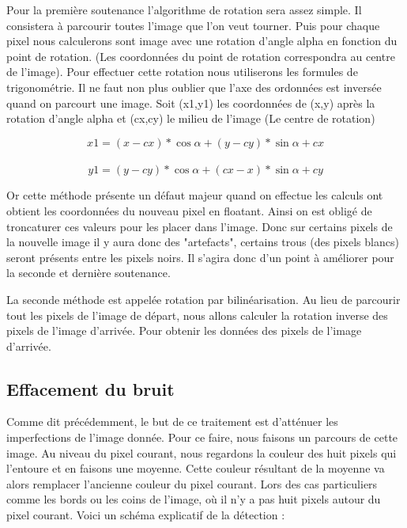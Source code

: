 \documentclass [french,12pt]{article}
\begin{document}
Pour la première soutenance l'algorithme de rotation sera assez simple. Il consistera à parcourir toutes l'image que l'on veut tourner. Puis pour chaque pixel nous calculerons sont image avec une rotation d'angle alpha en fonction du point de rotation. (Les coordonnées du point de rotation correspondra au centre de l'image).
Pour effectuer cette rotation nous utiliserons les formules de trigonométrie. Il ne faut non plus oublier que l'axe des ordonnées est inversée quand on parcourt une image. 
Soit (x1,y1) les coordonnées de (x,y) après la rotation d'angle alpha et (cx,cy) le milieu de l'image (Le centre de rotation)

\[x1 = (x-cx) * \cos \alpha + (y-cy) * \sin \alpha + cx \]
\\
\[y1 = (y-cy) * \cos \alpha + (cx-x) * \sin \alpha + cy \]

Or cette méthode présente un défaut majeur quand on effectue les calculs ont obtient les coordonnées du nouveau pixel en floatant. Ainsi on est obligé de troncaturer ces valeurs pour les placer dans l'image. Donc sur certains pixels de la nouvelle image il y aura donc des "artefacts", certains trous (des pixels blancs) seront présents entre les pixels noirs. Il s'agira donc d'un point à améliorer pour la seconde et dernière soutenance. 

La seconde méthode est appelée rotation par bilinéarisation. Au lieu de parcourir tout les pixels de l'image de départ, nous allons calculer la rotation inverse des pixels de l'image d'arrivée. Pour obtenir les données des pixels de l'image d'arrivée.  
\\
\subsection{Effacement du bruit}

Comme dit précédemment, le but de ce traitement est d'atténuer les imperfections de l'image donnée.
Pour ce faire, nous faisons un parcours de cette image. Au niveau du pixel courant, nous regardons la couleur des huit pixels qui l'entoure et en faisons une moyenne. Cette couleur résultant de la moyenne va alors remplacer l'ancienne couleur du pixel courant. Lors des cas particuliers comme les bords ou les coins de l'image, où il n'y a pas huit pixels autour du pixel courant.
Voici un schéma explicatif de la détection : 
\end{document}
